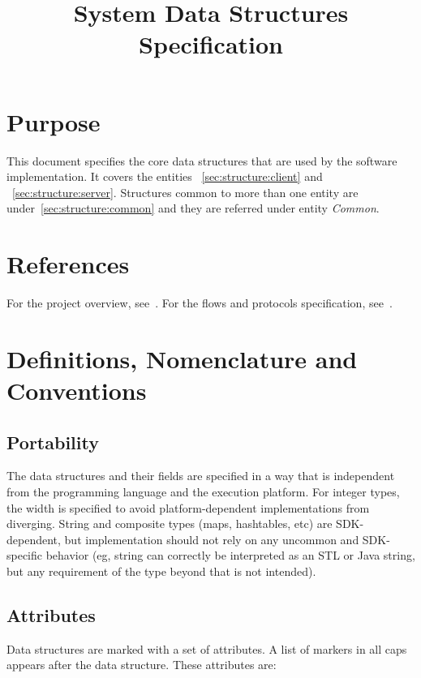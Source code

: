 \documentclass[a4paper,10pt]{article}
\title{\longProduct{} System Data Structures Specification}
\author{\yannis}
\newcommand{\common}{{\em Common}}
\begin{document}
\maketitle
\tableofcontents

\section{Purpose}
This document specifies the core data structures that are used by the \shortProduct{} software implementation. It covers the entities \client{}~\ref{sec:structure:client} and 
\server{}~\ref{sec:structure:server}. Structures common to more than one entity are under~\ref{sec:structure:common} and they are referred under entity \common{}.

\section{References}
For the project overview, see~\cite{project_spec}. For the flows and protocols specification, see~\cite{flow_spec}.

\section{Definitions, Nomenclature and Conventions}

\subsection{Portability}
The data structures and their fields are specified in a way that is independent from the programming language and the execution platform. For integer types, the width is specified 
to avoid platform-dependent implementations from diverging. String and composite types (maps, hashtables, etc) are SDK-dependent, but implementation should not rely on any uncommon 
and SDK-specific behavior (eg, string can correctly be interpreted as an STL or Java string, but any requirement of the type beyond that is not intended).

\subsection{Attributes}
Data structures are marked with a set of attributes. A list of markers in all caps appears after the data structure. These attributes are:

\newcommand{\persistent}{\MakeUppercase{persistent}}
\newcommand{\ephemeral}{\MakeUppercase{ephemeral}}
\newcommand{\secure}{\MakeUppercase{secure}}
\newcommand{\unsecure}{\MakeUppercase{unsecure}}
\newcommand{\infrastructure}{\MakeUppercase{infrastructure}}
\newcommand{\unique}{\MakeUppercase{unique}}
\end{document}
